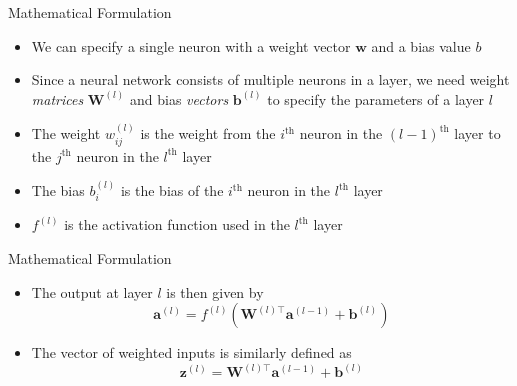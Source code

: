\documentclass{beamer}
\newcommand{\nth}[1]{$#1^\text{th}$}
\begin{document}
	\begin{frame}{Mathematical Formulation}
		\begin{itemize}
			\item <1-> We can specify a single neuron with a weight vector $\bm{w}$ and a bias value $b$
			\item <2-> Since a neural network consists of multiple neurons in a layer, we need weight \emph{matrices} $\bm{W}^{(l)}$ and bias \emph{vectors} $\bm{b}^{(l)}$ to specify the parameters of a layer $l$
			\item <3-> The weight $w_{ij}^{(l)}$  is the weight from the \nth{i} neuron in the \nth{(l-1)} layer to the \nth{j} neuron in the \nth{l} layer
			\item <4-> The bias $b_i^{(l)}$ is the bias of the \nth{i} neuron in the \nth{l} layer
			\item <5-> $f^{(l)}$ is the activation function used in the \nth{l} layer
		\end{itemize}
	\end{frame}
	\begin{frame}{Mathematical Formulation}
		\begin{itemize}
			\item <1-> The output at layer $l$ is then given by
			\begin{equation}
				\bm{a}^{(l)} = f^{(l)}\left(\bm{W}^{(l)\top}\bm{a}^{(l-1)}+\bm{b}^{(l)}\right)
			\end{equation}
			\item <2-> The vector of weighted inputs is similarly defined as
			\begin{equation}
			\bm{z}^{(l)} = \bm{W}^{(l)\top}\bm{a}^{(l-1)}+\bm{b}^{(l)}
			\end{equation}
		\end{itemize}
	\end{frame}
	
\end{document}
